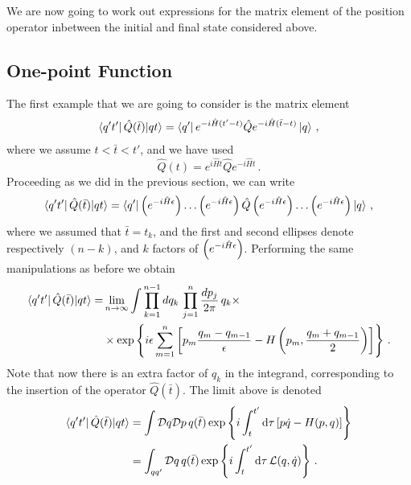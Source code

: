 \documentclass[notes]{subfiles}
\begin{document}
We are now going to work out expressions for the matrix element of the
position operator inbetween the initial and final state considered
above. 

\subsection{One-point Function}
\label{sec:one-point-function}

The first example that we are going to consider is the matrix element
\begin{align}
  \label{eq:OnePtDef}
  \bra{ q't'} \hat{Q}(\bar{t}) | q t\rangle = 
  \bra{ q'} e^{-i \hat{H}(t'-t)} \hat{Q} e^{-i \hat{H}(\bar{t}-t)}
  \ket{q}\, ,
\end{align}
where we assume $t<\bar{t}<t'$, and we have used
\begin{equation}
  \label{eq:HeisenOpEvol}
  \hat{Q}(t) = e^{i\hat{H} t} \hat{Q} e^{-i\hat{H} t}\, .
\end{equation}
Proceeding as we did in the previous section, we can write
\begin{align}
  \label{eq:CorrOne}
  \bra{ q't'} \hat{Q}(\bar{t}) | q t\rangle = 
  \bra{q'} \left(e^{-i \hat{H} \epsilon}\right) \ldots \left(e^{-i \hat{H} \epsilon}\right) \hat{Q} \left(e^{-i \hat{H} \epsilon}\right) \ldots
  \left(e^{-i \hat{H} \epsilon}\right) \ket{q}\, ,
\end{align}
where we assumed that $\bar{t}=t_k$, and the first and second ellipses
denote respectively $(n-k)$, and $k$ factors of $\left(e^{-i \hat{H} \epsilon}\right)$. Performing
the same manipulations as before we obtain
\begin{align}
  \bra{ q't'} \hat{Q}(\bar{t}) | q t\rangle =& 
  \lim_{n\to\infty} \int \prod_{k=1}^{n-1}dq_k\, 
  \prod_{j=1}^{n} \frac{dp_j}{2\pi}\, q_k \times \\
  &\times \exp \left\{
    i\epsilon \sum_{m=1}^{n} \left[
    p_m \frac{q_m-q_{m-1}}{\epsilon} - H\left(p_m, 
    \frac{q_m+q_{m-1}}{2}\right)
    \right]
    \right\}\, .
\end{align}
Note that now there is an extra factor of $q_k$ in the integrand,
corresponding to the insertion of the operator $\hat{Q}(\bar{t})$. The
limit above  is denoted
\begin{align}
  \bra{ q't'} \hat{Q}(\bar{t}) | q t\rangle &= 
  \int \mathcal{D}q \mathcal{D}p \, q(\bar{t}) 
  \exp \left\{
  i \int_t^{t'} \dd{\tau} \left[
  p \dot{q} - H(p,q)
  \right]
  \right\}\\
&= \int_{qq'} \mathcal{D}q \, q(\bar{t}) 
  \exp \left\{
  i \int_t^{t'} \dd{\tau} \mathcal{L}(q,\dot{q})
  \right\}\, .
\end{align}
\end{document}
